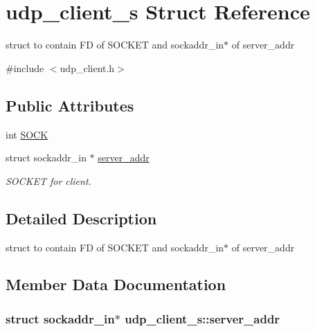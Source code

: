 \hypertarget{structudp__client__s}{\section{udp\-\_\-client\-\_\-s Struct Reference}
\label{structudp__client__s}
}


struct to contain F\-D of S\-O\-C\-K\-E\-T and sockaddr\-\_\-in$\ast$ of server\-\_\-addr  




{\ttfamily \#include $<$udp\-\_\-client.\-h$>$}

\subsection*{Public Attributes}
\begin{DoxyCompactItemize}
\item 
int \hyperlink{structudp__client__s_a34736fa42fc33898eda04c9269458125}{S\-O\-C\-K}
\item 
struct sockaddr\-\_\-in $\ast$ \hyperlink{structudp__client__s_a3bfbd53417ef12e30046dd9bdcfa2a7e}{server\-\_\-addr}
\begin{DoxyCompactList}\small\item\em S\-O\-C\-K\-E\-T for client. \end{DoxyCompactList}\end{DoxyCompactItemize}


\subsection{Detailed Description}
struct to contain F\-D of S\-O\-C\-K\-E\-T and sockaddr\-\_\-in$\ast$ of server\-\_\-addr 

\subsection{Member Data Documentation}
\hypertarget{structudp__client__s_a3bfbd53417ef12e30046dd9bdcfa2a7e}{
\subsubsection[{server\-\_\-addr}]{\setlength{\rightskip}{0pt plus 5cm}struct sockaddr\-\_\-in$\ast$ udp\-\_\-client\-\_\-s\-::server\-\_\-addr}}\label{structudp__client__s_a3bfbd53417ef12e30046dd9bdcfa2a7e}


